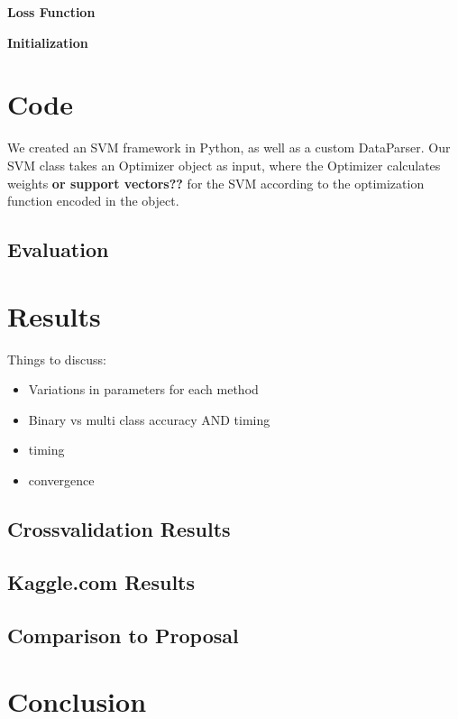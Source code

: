 \documentclass[letterpaper, 11pt]{article}
\begin{document}
\textbf{Loss Function}

\textbf{Initialization}


\section{Code}
We created an SVM framework in Python, as well as a custom DataParser.  Our SVM class takes an Optimizer object as input, where the Optimizer calculates weights \textbf{or support vectors??} for the SVM according to the optimization function encoded in the object. 

\subsection{Evaluation}

\section{Results}
Things to discuss:
\begin{itemize}
	\item Variations in parameters for each method
	\item Binary vs multi class accuracy AND timing
	\item timing
	\item convergence
\end{itemize}

\subsection{Crossvalidation Results}


\subsection{Kaggle.com Results}

\subsection{Comparison to Proposal}

\section{Conclusion}



\nocite{*}
 

\end{document}
